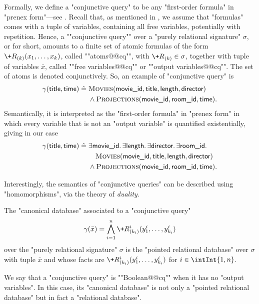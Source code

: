 Formally, we define a \AP"conjunctive query" to be
any "first-order formula" in "prenex form"---see .
Recall that, as mentioned in ,
we assume that "formulas" comes with a tuple of variables,
containing all free variables, potentially with repetition.
Hence, a \AP""conjunctive query"" over a "purely relational signature" $\sigma$,
or  for short, amounts to a finite set
of atomic formulas of the form $\+R_{(k)}(x_1,\hdots,x_k)$,
called ""atoms@@cq"", with $\+R_{(k)} \in \sigma$,
together with tuple of variables $\bar x$, called ""free variables@@cq""
or ""output variables@@cq"". The set of atoms is denoted conjunctively.
So, an example of "conjunctive query" is
\begin{align*}
	\gamma(\textsf{title}, \textsf{time}) \mathrel{\hat{=}}\; 
	& \textsc{Movies}(\textsf{movie\_id}, \textsf{title}, \textsf{length}, \textsf{director}) \\
	& \land
	\textsc{Projections}(\textsf{movie\_id}, \textsf{room\_id}, \textsf{time}).
\end{align*} 
Semantically, it is interpreted as the "first-order formula" in "prenex form"
in which every variable that is not an "output variable" is quantified existentially,
giving in our case
\begin{align*}
	\gamma(\textsf{title}, \textsf{time}) \mathrel{\hat{=}}\; 
	& \exists \textsf{movie\_id}.\, 
	\exists \textsf{length}.\, 
	\exists \textsf{director}.\,
	\exists \textsf{room\_id}.\, \\
	& \hphantom{\land~} \textsc{Movies}(\textsf{movie\_id}, \textsf{title}, \textsf{length}, \textsf{director}) \\
	& \land
	\textsc{Projections}(\textsf{movie\_id}, \textsf{room\_id}, \textsf{time}).
\end{align*} 

Interestingly, the semantics of "conjunctive queries" can be described using "homomorphisms",
via the theory of \emph{duality}.
\begin{definition}
	The "canonical database" associated to a "conjunctive query"
	\[
		\gamma(\bar x) = \bigwedge_{i=1}^n \+R^i_{(k_i)}(y^i_1,\dotsc,y^i_{k_i})
	\]
	over the "purely relational signature" $\sigma$ is the "pointed relational database"
	over $\sigma$ with tuple $\bar x$ and whose facts are
	$\+R^i_{(k_i)}(y^i_1,\dotsc,y^i_{k_i})$ for $i \in \intInt{1,n}$.
\end{definition}
We say that a "conjunctive query" is ""Boolean@@cq"" when it has no "output variables".
In this case, its "canonical database" is not only a "pointed relational database" but
in fact a "relational database".

